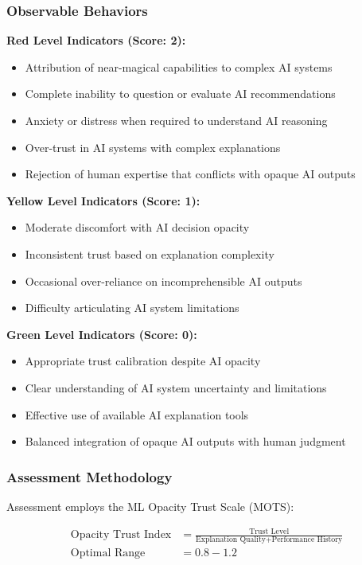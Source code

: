 \documentclass[11pt,a4paper]{article}
\begin{document}
\subsubsection{Observable Behaviors}

\textbf{Red Level Indicators (Score: 2):}
\begin{itemize}
\item Attribution of near-magical capabilities to complex AI systems
\item Complete inability to question or evaluate AI recommendations
\item Anxiety or distress when required to understand AI reasoning
\item Over-trust in AI systems with complex explanations
\item Rejection of human expertise that conflicts with opaque AI outputs
\end{itemize}

\textbf{Yellow Level Indicators (Score: 1):}
\begin{itemize}
\item Moderate discomfort with AI decision opacity
\item Inconsistent trust based on explanation complexity
\item Occasional over-reliance on incomprehensible AI outputs
\item Difficulty articulating AI system limitations
\end{itemize}

\textbf{Green Level Indicators (Score: 0):}
\begin{itemize}
\item Appropriate trust calibration despite AI opacity
\item Clear understanding of AI system uncertainty and limitations
\item Effective use of available AI explanation tools
\item Balanced integration of opaque AI outputs with human judgment
\end{itemize}

\subsubsection{Assessment Methodology}

Assessment employs the ML Opacity Trust Scale (MOTS):

\begin{align}
\text{Opacity Trust Index} &= \frac{\text{Trust Level}}{\text{Explanation Quality} + \text{Performance History}} \\
\text{Optimal Range} &= 0.8 - 1.2
\end{align}
\end{document}
